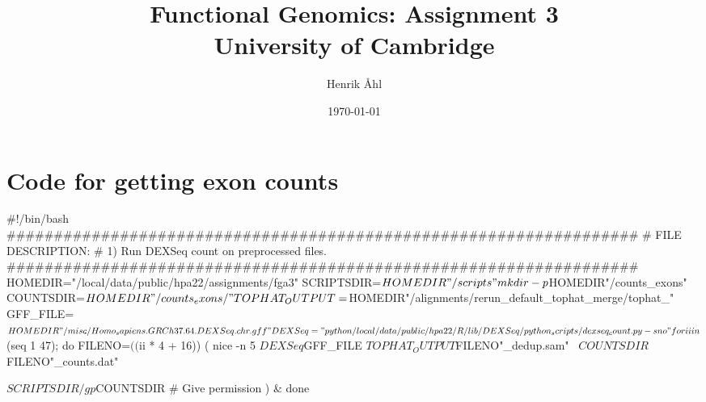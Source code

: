 \documentclass[10pt, twocolumn]{article}\usepackage[]{graphicx}\usepackage[]{color}
\title
{
  \textbf
  {
    Functional Genomics: Assignment 3}\\[1em]
  \small{University of Cambridge}
}
\author{Henrik Åhl}
\date{\today}
\theoremstyle{plain}
\begin{document}
\onecolumn
\maketitle


\section*{Code for getting exon counts}  
\begin{Schunk}
\begin{Sinput}
#!/bin/bash
###################################################################
# FILE DESCRIPTION:
# 1) Run DEXSeq count on preprocessed files. 
###################################################################
HOMEDIR="/local/data/public/hpa22/assignments/fga3"
SCRIPTSDIR=$HOMEDIR"/scripts"
mkdir -p $HOMEDIR"/counts_exons"
COUNTSDIR=$HOMEDIR"/counts_exons/"
TOPHAT_OUTPUT=$HOMEDIR"/alignments/rerun_default_tophat_merge/tophat_"
GFF_FILE=$HOMEDIR"/misc/Homo_sapiens.GRCh37.64.DEXSeq.chr.gff"
DEXSeq="python /local/data/public/hpa22/R/lib/DEXSeq/python_scripts/dexseq_count.py -s no"

for ii in $(seq 1 47); do
  FILENO=$(($ii * 4 + 16))
  (
     nice -n 5 $DEXSeq $GFF_FILE $TOPHAT_OUTPUT$FILENO"_dedup.sam" \
        $COUNTSDIR$FILENO"_counts.dat"
     
     $SCRIPTSDIR/gp $COUNTSDIR # Give permission
  ) &
done
\end{Sinput}
\end{Schunk}
\end{document}
